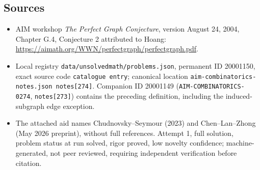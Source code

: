 \documentclass[11pt]{article}
\begin{document}
\subsection{Sources}
\begin{itemize}
\item AIM workshop \emph{The Perfect Graph Conjecture}, version August 24, 2004, Chapter G.4, Conjecture 2 attributed to Hoang: \url{https://aimath.org/WWN/perfectgraph/perfectgraph.pdf}.
\item Local registry \texttt{data/unsolvedmath/problems.json}, permanent ID 20001150, exact source code \texttt{catalogue entry}; canonical location \texttt{aim-combinatorics-notes.json notes[274]}. Companion ID 20001149 (\texttt{AIM-COMBINATORICS-0274}, \texttt{notes[273]}) contains the preceding definition, including the induced-subgraph edge exception.
\item The attached aid names Chudnovsky--Seymour (2023) and Chen--Lan--Zhong (May 2026 preprint), without full references. Attempt 1, full solution, problem status at run solved, rigor proved, low novelty confidence; machine-generated, not peer reviewed, requiring independent verification before citation.
\end{itemize}
\end{document}
